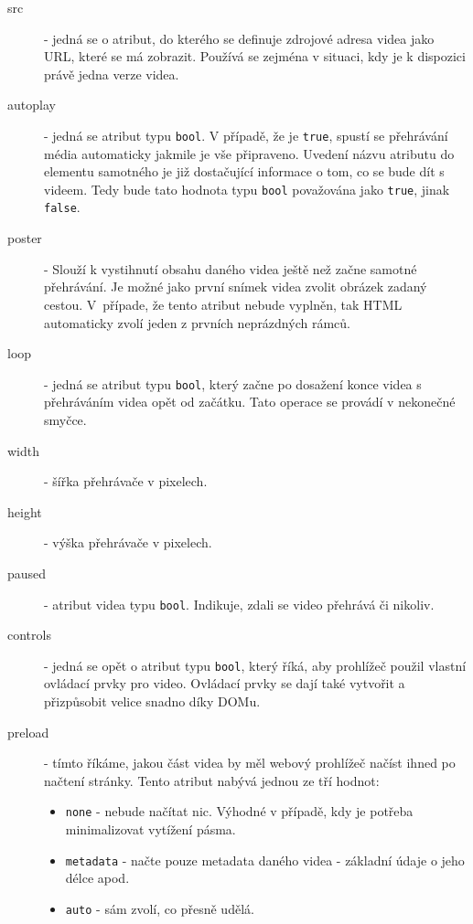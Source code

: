 \begin{description}
	\item[src] - jedná se o atribut, do kterého se definuje zdrojové adresa videa jako URL, které se má zobrazit. Používá se zejména v situaci, kdy je k dispozici právě jedna verze videa.
	
	\item[autoplay] - jedná se atribut typu \texttt{bool}. V případě, že je \texttt{true}, spustí se přehrávání média automaticky jakmile je vše připraveno. Uvedení názvu atributu do elementu samotného je již dostačující informace o tom, co se bude dít s videem. Tedy bude tato hodnota typu \texttt{bool} považována jako \texttt{true}, jinak \texttt{false}.	
	
	\item[poster]  - Slouží k vystihnutí obsahu daného videa ještě než začne samotné přehrávání. Je možné jako první snímek videa zvolit obrázek zadaný cestou. V~případe, že tento atribut nebude vyplněn, tak HTML automaticky zvolí jeden z prvních neprázdných rámců.
	
	\item[loop]  - jedná se atribut typu \texttt{bool}, který začne po dosažení konce videa s přehráváním videa opět od začátku. Tato operace se provádí v nekonečné smyčce.

	\item[width] - šířka přehrávače v pixelech.
	
	\item[height] - výška přehrávače v pixelech.

	\item[paused] - atribut videa typu \texttt{bool}. Indikuje, zdali se video přehrává či nikoliv.

	\item[controls] - jedná se opět o atribut typu \texttt{bool}, který říká, aby prohlížeč použil vlastní ovládací prvky pro video. Ovládací prvky se dají také vytvořit a přizpůsobit velice snadno díky DOMu.
 	
 	\item[preload]  - tímto říkáme, jakou část videa by měl webový prohlížeč načíst ihned po načtení stránky. Tento atribut nabývá jednou ze tří hodnot:
	 	\begin{itemize}
	 		\item \texttt{none} - nebude načítat nic. Výhodné v případě, kdy je potřeba minimalizovat vytížení pásma.	 		
	 		\item \texttt{metadata} - načte pouze metadata daného videa - základní údaje o jeho délce apod.
	 		\item \texttt{auto} - sám zvolí, co přesně udělá.
	 	\end{itemize}
\end{description}

